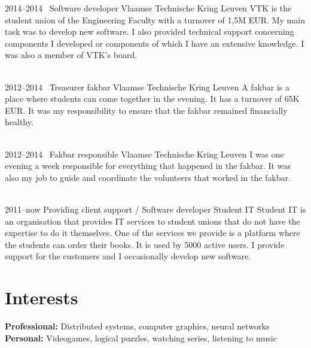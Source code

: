 \documentclass[a4paper]{friggeri-cv} %
\begin{document}
\begin{entrylist}
\entry
{2014--2014~}
{Software developer}
{Vlaamse Technische Kring Leuven}
{VTK is the student union of the Engineering Faculty with a turnover of 1,5M EUR. My main task was to develop new software. I also provided technical support concerning components I developed or components of which I have an extensive knowledge.
I was also a member of VTK’s board.\\
~}


\entry
{2012--2014~}
{Treasurer fakbar}
{Vlaamse Technische Kring Leuven}
{A fakbar is a place where students can come together in the evening. It has a turnover of 65K EUR. It was my responsibility to ensure that the fakbar remained financially healthy.\\
~}


\entry
{2012--2014~}
{Fakbar responsible}
{Vlaamse Technische Kring Leuven}
{I was one evening a week responsible for everything that happened in the fakbar. It was also my job to guide and coordinate the volunteers that worked in the fakbar.\\
~}


\entry
{2011--now}
{Providing client support / Software developer}
{Student IT}
{Student IT is an organisation that provides IT services to student unions that do not have the expertise to do it themselves. One of the services we provide is a platform
where the students can order their books. It is used by 5000 active users.
I provide support for the customers and I occasionally develop new software.}

\end{entrylist}



\section{Interests}

\textbf{Professional:} Distributed systems, computer graphics,  neural networks\\
\textbf{Personal:} Videogames, logical puzzles, watching series, listening to music

\newpage
\addtolength{\oddsidemargin}{-1.7cm}
\addtolength{\evensidemargin}{-1.7cm}
\end{document}
